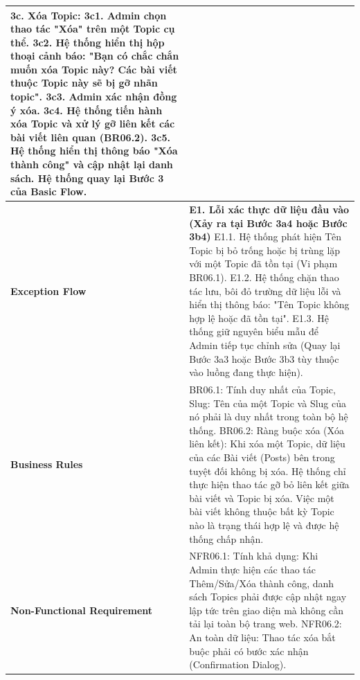 \documentclass[a4paper,12pt]{article}
\begin{document}
\begin{longtable}{|p{4cm}|p{11.5cm}|}
3c. Xóa Topic: \newline
3c1. Admin chọn thao tác "Xóa" trên một Topic cụ thể. \newline
3c2. Hệ thống hiển thị hộp thoại cảnh báo: "Bạn có chắc chắn muốn xóa Topic này? Các bài viết thuộc Topic này sẽ bị gỡ nhãn topic". \newline
3c3. Admin xác nhận đồng ý xóa. \newline
3c4. Hệ thống tiến hành xóa Topic và xử lý gỡ liên kết các bài viết liên quan (BR06.2). \newline
3c5. Hệ thống hiển thị thông báo "Xóa thành công" và cập nhật lại danh sách. \newline
Hệ thống quay lại Bước 3 của Basic Flow. \\ \hline
\textbf{Exception Flow} & 
\textbf{E1. Lỗi xác thực dữ liệu đầu vào (Xảy ra tại Bước 3a4 hoặc Bước 3b4)} \newline
E1.1. Hệ thống phát hiện Tên Topic bị bỏ trống hoặc bị trùng lặp với một Topic đã tồn tại (Vi phạm BR06.1). \newline
E1.2. Hệ thống chặn thao tác lưu, bôi đỏ trường dữ liệu lỗi và hiển thị thông báo: "Tên Topic không hợp lệ hoặc đã tồn tại". \newline
E1.3. Hệ thống giữ nguyên biểu mẫu để Admin tiếp tục chỉnh sửa (Quay lại Bước 3a3 hoặc Bước 3b3 tùy thuộc vào luồng đang thực hiện). \\ \hline
\textbf{Business Rules} & 
BR06.1: Tính duy nhất của Topic, Slug: Tên của một Topic và Slug của nó phải là duy nhất trong toàn bộ hệ thống. \newline
BR06.2: Ràng buộc xóa (Xóa liên kết): Khi xóa một Topic, dữ liệu của các Bài viết (Posts) bên trong tuyệt đối không bị xóa. Hệ thống chỉ thực hiện thao tác gỡ bỏ liên kết giữa bài viết và Topic bị xóa. Việc một bài viết không thuộc bất kỳ Topic nào là trạng thái hợp lệ và được hệ thống chấp nhận. \\ \hline
\textbf{Non-Functional Requirement} & 
NFR06.1: Tính khả dụng: Khi Admin thực hiện các thao tác Thêm/Sửa/Xóa thành công, danh sách Topics phải được cập nhật ngay lập tức trên giao diện mà không cần tải lại toàn bộ trang web. \newline
NFR06.2: An toàn dữ liệu: Thao tác xóa bắt buộc phải có bước xác nhận (Confirmation Dialog). \\ \hline
\end{longtable}
\end{document}
